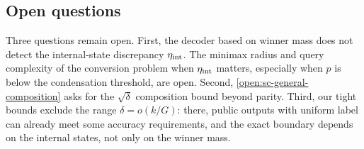 \subsection{Open questions}
\label{sec:state-conversion-open}

Three questions remain open.  First, the decoder based on winner mass does
not detect the internal-state discrepancy $\eta_{\rm int}$.  The minimax
radius and query complexity of the conversion problem when $\eta_{\rm int}$
matters, especially when $p$ is below the condensation threshold, are
open.  Second,
\cref{open:sc-general-composition} asks for the $\sqrt\delta$ composition
bound beyond parity.  Third, our tight bounds exclude the range
$\delta=o(k/G)$: there, public outputs with uniform label can already meet
some accuracy requirements, and the exact boundary depends on the internal
states, not only on the winner mass.
